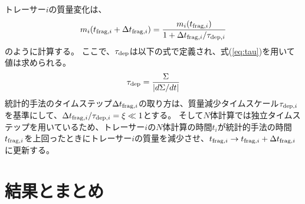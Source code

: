 \documentclass[a4paper,10pt,oneside,twocolumn,notitlepage,final]{jarticle}
\begin{document}
トレーサー$i$の質量変化は、
\begin{align}
 m_i(t_{{\rm frag},i} + \Delta t_{{\rm frag},i}) = \frac{m_i(t_{{\rm frag},i})}{1 + \Delta t_{{\rm frag},i}/\tau_{{\rm dep},i}}
\end{align}
のように計算する。
ここで、$\tau_{\rm dep}$は以下の式で定義され、式(\ref{eq:tau})を用いて値は求められる。
\begin{align}
 \tau_{\rm dep} = \frac{\Sigma}{|d \Sigma/ dt|}
\end{align}
統計的手法のタイムステップ$\Delta t_{{\rm frag},i}$の取り方は、質量減少タイムスケール$\tau_{{\rm dep},i}$を基準にして、$\Delta t_{{\rm frag},i}/\tau_{{\rm dep},i} = \xi \ll 1$とする。
そして$N$体計算では独立タイムステップを用いているため、トレーサー$i$の$N$体計算の時間$t_i$が統計的手法の時間$t_{{\rm frag},i}$を上回ったときにトレーサー$i$の質量を減少させ、$t_{{\rm frag},i} \to t_{{\rm frag},i} + \Delta t_{{\rm frag},i}$に更新する。

\section{結果とまとめ}
\end{document}
